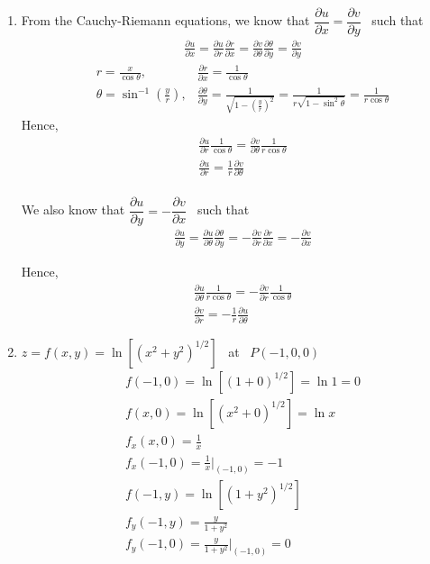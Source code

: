 \documentclass[12pt]{amsart}
\begin{document}
\begin{enumerate}
	\item From the Cauchy-Riemann equations, we know that $\dfrac{\partial u}{\partial x}=\dfrac{\partial v}{\partial y}$ \ such that
		\begin{align*}
			 &\frac{\partial u}{\partial x}=\frac{\partial u}{\partial r} \frac{\partial r}{\partial x}=\frac{\partial v}{\partial \theta}\frac{\partial \theta}{\partial y}=\frac{\partial v}{\partial y}
		\end{align*}
		\begin{align*}
			&r=\frac{x}{\cos \theta}, &\frac{\partial r}{\partial x}=\frac{1}{\cos \theta} \\
			&\theta=\sin^{-1}\left(\frac{y}{r}\right), &\frac{\partial \theta}{\partial y}= \frac{1}{\sqrt{1-\left(\frac{y}{r}\right)^2}}=\frac{1}{r\sqrt{1-\sin^2\theta}}=\frac{1}{r\cos \theta}
		\end{align*}	
		Hence,
		\begin{align*}
			&\frac{\partial u}{\partial r} \frac{1}{\cos \theta}=\frac{\partial v}{\partial \theta}\frac{1}{r\cos \theta} \\
			&\frac{\partial u}{\partial r}=\frac{1}{r}\frac{\partial v}{\partial \theta} \\
		\end{align*}

		We also know that $\dfrac{\partial u}{\partial y}=-\dfrac{\partial v}{\partial x}$ \ such that
		\begin{align*}
			&\frac{\partial u}{\partial y}=\frac{\partial u}{\partial \theta} \frac{\partial \theta}{\partial y}=-\frac{\partial v}{\partial r}\frac{\partial r}{\partial x}=-\frac{\partial v}{\partial x}
		\end{align*}
		
		Hence,
		\begin{align*}
			&\frac{\partial u}{\partial \theta} \frac{1}{r\cos \theta}= -\frac{\partial v}{\partial r}\frac{1}{\cos \theta} \\
			&\frac{\partial v}{\partial r}=-\frac{1}{r}\frac{\partial u}{\partial \theta}
		\end{align*}
		
	\medskip
	
	\item $z=f(x,y)=\ln \left[(x^2+y^2)^{1/2}\right]$ \ at \ $P(-1,0,0)$
		\begin{align*}
			&f(-1,0)=\ln\left[(1+0)^{1/2}\right]=\ln 1=0 \\
			&f(x,0)=\ln\left[(x^2+0)^{1/2}\right]=\ln x \\
			&f_x(x,0)=\frac{1}{x} \\
			&f_x(-1,0)=\frac{1}{x}\Big|_{(-1,0)}=-1 \\
			&f(-1,y)=\ln\left[(1+y^2)^{1/2}\right] \\
			&f_y(-1,y)=\frac{y}{1+y^2} \\
			&f_y(-1,0)=\frac{y}{1+y^2}\Big|_{(-1,0)}=0
		\end{align*}
	

\end{enumerate}
\end{document}
